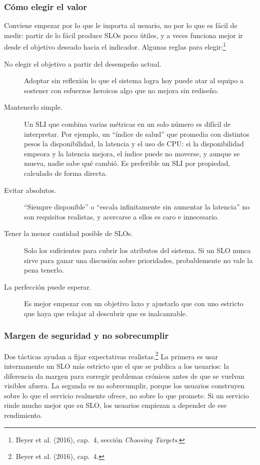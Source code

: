 \documentclass[variant=apuntes,cover=institutional,mode=screen]{ua-engineering-v6-article}
\begin{document}
\subsubsection{Cómo elegir el valor}

Conviene empezar por lo que le importa al usuario, no por lo que es fácil de medir: partir de lo fácil produce SLOs poco útiles, y a veces funciona mejor ir desde el objetivo deseado hacia el indicador. Algunas reglas para elegir:\footnote{Beyer et al. (2016), cap.~4, sección \emph{Choosing Targets}.}
\begin{description}
\item[No elegir el objetivo a partir del desempeño actual.] Adoptar sin reflexión lo que el sistema logra hoy puede atar al equipo a sostener con esfuerzos heroicos algo que no mejora sin rediseño.
\item[Mantenerlo simple.] Un SLI que combina varias métricas en un solo número es difícil de interpretar. Por ejemplo, un ``índice de salud'' que promedia con distintos pesos la disponibilidad, la latencia y el uso de CPU: si la disponibilidad empeora y la latencia mejora, el índice puede no moverse, y aunque se mueva, nadie sabe qué cambió. Es preferible un SLI por propiedad, calculado de forma directa.
\item[Evitar absolutos.] ``Siempre disponible'' o ``escala infinitamente sin aumentar la latencia'' no son requisitos realistas, y acercarse a ellos es caro e innecesario.
\item[Tener la menor cantidad posible de SLOs.] Solo los suficientes para cubrir los atributos del sistema. Si un SLO nunca sirve para ganar una discusión sobre prioridades, probablemente no vale la pena tenerlo.
\item[La perfección puede esperar.] Es mejor empezar con un objetivo laxo y ajustarlo que con uno estricto que haya que relajar al descubrir que es inalcanzable.
\end{description}

\subsubsection{Margen de seguridad y no sobrecumplir}

Dos tácticas ayudan a fijar expectativas realistas.\footnote{Beyer et al. (2016), cap.~4.} La primera es usar internamente un SLO más estricto que el que se publica a los usuarios: la diferencia da margen para corregir problemas crónicos antes de que se vuelvan visibles afuera. La segunda es no sobrecumplir, porque los usuarios construyen sobre lo que el servicio realmente ofrece, no sobre lo que promete. Si un servicio rinde mucho mejor que su SLO, los usuarios empiezan a depender de ese rendimiento.
\end{document}

